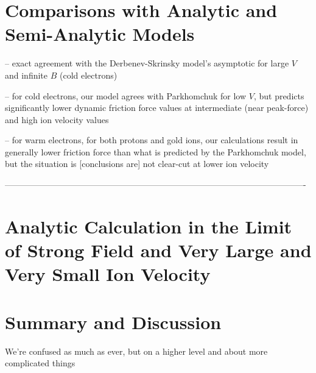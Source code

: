 \documentclass[12pt, reqno]{amsart}
\begin{document}
\section{Comparisons with Analytic and Semi-Analytic Models}

-- exact agreement with the Derbenev-Skrinsky model's asymptotic for large $V$ and infinite $B$ (cold electrons) 

-- for cold electrons, our model agrees with Parkhomchuk for low $V$, but predicts significantly lower dynamic friction force values at intermediate (near peak-force) and high ion velocity values 

 -- for warm electrons,  for both protons and gold ions, our calculations result in generally lower friction force than what is predicted by the Parkhomchuk model, but the situation is [conclusions are] not clear-cut at lower ion velocity 
 
---------------------------------------------------------------------------------------------------------- 

 
\section{Analytic Calculation in the Limit of Strong Field and Very Large and Very Small Ion Velocity}



\section{Summary and Discussion}

We're confused as much as ever, but on a higher level and about more complicated things 
\end{document}
